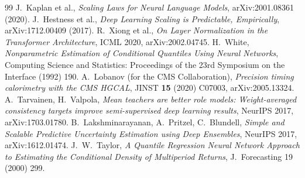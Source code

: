\documentclass[11pt,a4paper]{article}
\begin{document}
\begin{thebibliography}{99}
 J.~Kaplan et al.,
\emph{Scaling Laws for Neural Language Models}, arXiv:2001.08361 (2020).
 J.~Hestness et al.,
\emph{Deep Learning Scaling is Predictable, Empirically},
arXiv:1712.00409 (2017).
 R.~Xiong et al.,
\emph{On Layer Normalization in the Transformer Architecture},
ICML 2020, arXiv:2002.04745.
 H.~White,
\emph{Nonparametric Estimation of Conditional Quantiles Using Neural
Networks}, Computing Science and Statistics: Proceedings of the 23rd
Symposium on the Interface (1992) 190.
 A.~Lobanov (for the CMS Collaboration),
\emph{Precision timing calorimetry with the CMS HGCAL},
JINST \textbf{15} (2020) C07003, arXiv:2005.13324.
 A.~Tarvainen, H.~Valpola,
\emph{Mean teachers are better role models: Weight-averaged consistency
targets improve semi-supervised deep learning results},
NeurIPS 2017, arXiv:1703.01780.
 B.~Lakshminarayanan, A.~Pritzel, C.~Blundell,
\emph{Simple and Scalable Predictive Uncertainty Estimation using Deep
Ensembles}, NeurIPS 2017, arXiv:1612.01474.
 J.~W.~Taylor,
\emph{A Quantile Regression Neural Network Approach to Estimating the
Conditional Density of Multiperiod Returns},
J.\ Forecasting 19 (2000) 299.
\end{thebibliography}
\end{document}
